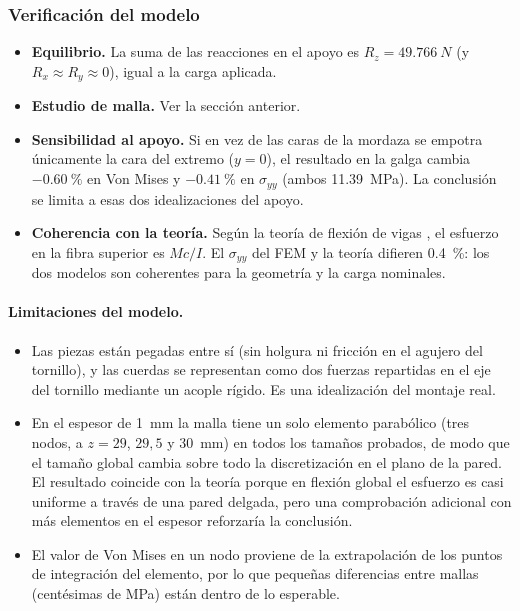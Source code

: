 \documentclass[11pt,a4paper]{article}
\begin{document}
\subsubsection{Verificaci\'on del modelo}
\begin{itemize}
\item \textbf{Equilibrio.} La suma de las reacciones en el apoyo es $R_z=\SI{49,766}{N}$ (y $R_x\approx R_y\approx0$), igual a la carga aplicada.
\item \textbf{Estudio de malla.} Ver la secci\'on anterior.
\item \textbf{Sensibilidad al apoyo.} Si en vez de las caras de la mordaza se empotra \'unicamente la cara del extremo ($y=0$), el resultado en la galga cambia $\SI{-0,60}{\percent}$ en Von Mises y $\SI{-0,41}{\percent}$ en $\sigma_{yy}$ (ambos \SI{11,39}{MPa}). La conclusi\'on se limita a esas dos idealizaciones del apoyo.
\item \textbf{Coherencia con la teor\'ia.} Seg\'un la teor\'ia de flexi\'on de vigas \cite{beer}, el esfuerzo en la fibra superior es $Mc/I$. El $\sigma_{yy}$ del FEM y la teor\'ia difieren \SI{0,4}{\percent}: los dos modelos son coherentes para la geometr\'ia y la carga nominales.
\end{itemize}

\paragraph{Limitaciones del modelo.}
\begin{itemize}
\item Las piezas est\'an pegadas entre s\'i (sin holgura ni fricci\'on en el agujero del tornillo), y las cuerdas se representan como dos fuerzas repartidas en el eje del tornillo mediante un acople r\'igido. Es una idealizaci\'on del montaje real.
\item En el espesor de \SI{1}{mm} la malla tiene un solo elemento parab\'olico (tres nodos, a $z=29$, $29{,}5$ y \SI{30}{mm}) en todos los tama\~nos probados, de modo que el tama\~no global cambia sobre todo la discretizaci\'on en el plano de la pared. El resultado coincide con la teor\'ia porque en flexi\'on global el esfuerzo es casi uniforme a trav\'es de una pared delgada, pero una comprobaci\'on adicional con m\'as elementos en el espesor reforzar\'ia la conclusi\'on.
\item El valor de Von Mises en un nodo proviene de la extrapolaci\'on de los puntos de integraci\'on del elemento, por lo que peque\~nas diferencias entre mallas (centésimas de MPa) est\'an dentro de lo esperable.
\end{itemize}
\end{document}
